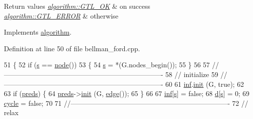 \begin{DoxyRetVals}{Return values}
{\em \mbox{\hyperlink{classalgorithm_af1a0078e153aa99c24f9bdf0d97f6710a5114c20e4a96a76b5de9f28bf15e282b}{algorithm\+::\+G\+T\+L\+\_\+\+OK}}} & on success \\
\hline
{\em \mbox{\hyperlink{classalgorithm_af1a0078e153aa99c24f9bdf0d97f6710a6fcf574690bbd6cf710837a169510dd7}{algorithm\+::\+G\+T\+L\+\_\+\+E\+R\+R\+OR}}} & otherwise \\
\hline
\end{DoxyRetVals}


Implements \mbox{\hyperlink{classalgorithm_a734b189509a8d6b56b65f8ff772d43ca}{algorithm}}.



Definition at line 50 of file bellman\+\_\+ford.\+cpp.


\begin{DoxyCode}
51 \{
52     \textcolor{keywordflow}{if} (\mbox{\hyperlink{classbellman__ford_a2d6ce715e65b26822c622b322811c3b0}{s}} == \mbox{\hyperlink{classnode}{node}}()) 
53     \{
54     \mbox{\hyperlink{classbellman__ford_a2d6ce715e65b26822c622b322811c3b0}{s}} = *(G.nodes\_begin());
55     \}
56 
57     \textcolor{comment}{//----------------------------------------------------------------------}
58     \textcolor{comment}{//   initialize}
59     \textcolor{comment}{//----------------------------------------------------------------------}
60 
61     \mbox{\hyperlink{classbellman__ford_a5c69a3ac59077a7a7e4b0484e5f85a32}{inf}}.\mbox{\hyperlink{classne__map_a4ef2ab4aebcb57a7a101975bf6a88e24}{init}} (G, \textcolor{keyword}{true});
62     
63     \textcolor{keywordflow}{if} (\mbox{\hyperlink{classbellman__ford_a1ce37529c697ec5b89e8dc09204e4f59}{preds}}) \{
64     \mbox{\hyperlink{classbellman__ford_a1ce37529c697ec5b89e8dc09204e4f59}{preds}}->\mbox{\hyperlink{classne__map_a4ef2ab4aebcb57a7a101975bf6a88e24}{init}} (G, \mbox{\hyperlink{classedge}{edge}}());
65     \}
66 
67     \mbox{\hyperlink{classbellman__ford_a5c69a3ac59077a7a7e4b0484e5f85a32}{inf}}[\mbox{\hyperlink{classbellman__ford_a2d6ce715e65b26822c622b322811c3b0}{s}}] = \textcolor{keyword}{false};
68     \mbox{\hyperlink{classbellman__ford_a0e3b99854a3f998f8ef6cde6fb902040}{d}}[\mbox{\hyperlink{classbellman__ford_a2d6ce715e65b26822c622b322811c3b0}{s}}] = 0;
69     \mbox{\hyperlink{classbellman__ford_aa2168afff14546b2fd99d2b52681156b}{cycle}} = \textcolor{keyword}{false};
70 
71     \textcolor{comment}{//----------------------------------------------------------------------}
72     \textcolor{comment}{//   relax}

\end{DoxyCode}

